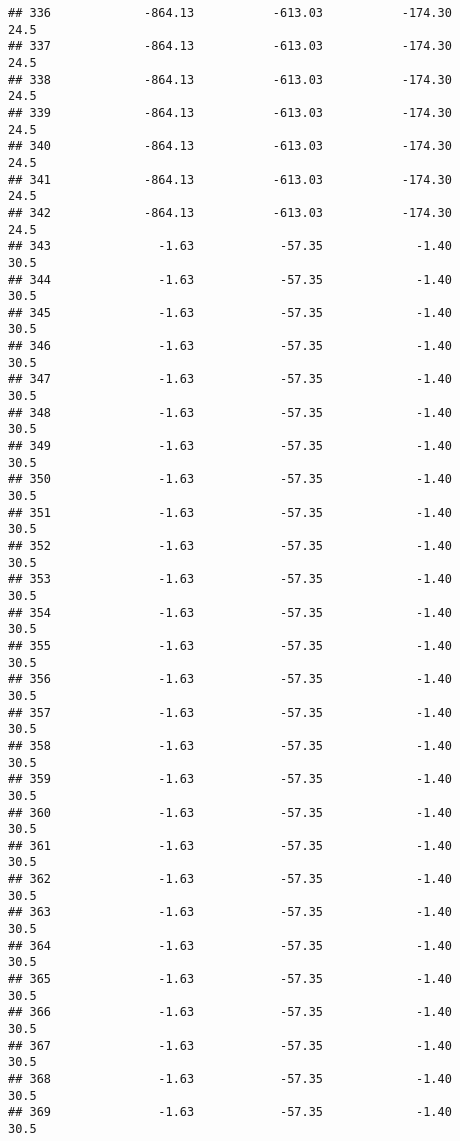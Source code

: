 \documentclass[]{article}
\begin{document}
\begin{verbatim}
## 336             -864.13           -613.03           -174.30           24.5
## 337             -864.13           -613.03           -174.30           24.5
## 338             -864.13           -613.03           -174.30           24.5
## 339             -864.13           -613.03           -174.30           24.5
## 340             -864.13           -613.03           -174.30           24.5
## 341             -864.13           -613.03           -174.30           24.5
## 342             -864.13           -613.03           -174.30           24.5
## 343               -1.63            -57.35             -1.40           30.5
## 344               -1.63            -57.35             -1.40           30.5
## 345               -1.63            -57.35             -1.40           30.5
## 346               -1.63            -57.35             -1.40           30.5
## 347               -1.63            -57.35             -1.40           30.5
## 348               -1.63            -57.35             -1.40           30.5
## 349               -1.63            -57.35             -1.40           30.5
## 350               -1.63            -57.35             -1.40           30.5
## 351               -1.63            -57.35             -1.40           30.5
## 352               -1.63            -57.35             -1.40           30.5
## 353               -1.63            -57.35             -1.40           30.5
## 354               -1.63            -57.35             -1.40           30.5
## 355               -1.63            -57.35             -1.40           30.5
## 356               -1.63            -57.35             -1.40           30.5
## 357               -1.63            -57.35             -1.40           30.5
## 358               -1.63            -57.35             -1.40           30.5
## 359               -1.63            -57.35             -1.40           30.5
## 360               -1.63            -57.35             -1.40           30.5
## 361               -1.63            -57.35             -1.40           30.5
## 362               -1.63            -57.35             -1.40           30.5
## 363               -1.63            -57.35             -1.40           30.5
## 364               -1.63            -57.35             -1.40           30.5
## 365               -1.63            -57.35             -1.40           30.5
## 366               -1.63            -57.35             -1.40           30.5
## 367               -1.63            -57.35             -1.40           30.5
## 368               -1.63            -57.35             -1.40           30.5
## 369               -1.63            -57.35             -1.40           30.5

\end{verbatim}
\end{document}
